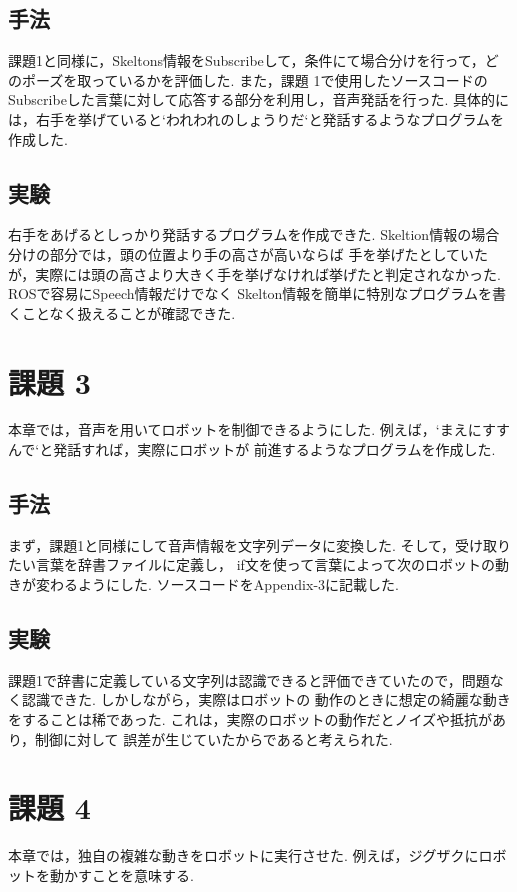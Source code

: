 \documentclass[10pt,a4j]{jsarticle}
\begin{document}
  \subsection{手法}
  課題1と同様に，Skeltons情報をSubscribeして，条件にて場合分けを行って，どのポーズを取っているかを評価した.
  また，課題 1で使用したソースコードのSubscribeした言葉に対して応答する部分を利用し，音声発話を行った.
  具体的には，右手を挙げていると`われわれのしょうりだ`と発話するようなプログラムを作成した.

  \subsection{実験}
  右手をあげるとしっかり発話するプログラムを作成できた. Skeltion情報の場合分けの部分では，頭の位置より手の高さが高いならば
  手を挙げたとしていたが，実際には頭の高さより大きく手を挙げなければ挙げたと判定されなかった. ROSで容易にSpeech情報だけでなく
  Skelton情報を簡単に特別なプログラムを書くことなく扱えることが確認できた.

\section{課題 3}
  本章では，音声を用いてロボットを制御できるようにした. 例えば，`まえにすすんで`と発話すれば，実際にロボットが
  前進するようなプログラムを作成した.

  \subsection{手法}
  まず，課題1と同様にして音声情報を文字列データに変換した. そして，受け取りたい言葉を辞書ファイルに定義し，
  if文を使って言葉によって次のロボットの動きが変わるようにした. ソースコードをAppendix-3に記載した.

  \subsection{実験}
  課題1で辞書に定義している文字列は認識できると評価できていたので，問題なく認識できた. しかしながら，実際はロボットの
  動作のときに想定の綺麗な動きをすることは稀であった. これは，実際のロボットの動作だとノイズや抵抗があり，制御に対して
  誤差が生じていたからであると考えられた.

\section{課題 4}
  本章では，独自の複雑な動きをロボットに実行させた. 例えば，ジグザクにロボットを動かすことを意味する.
\end{document}
